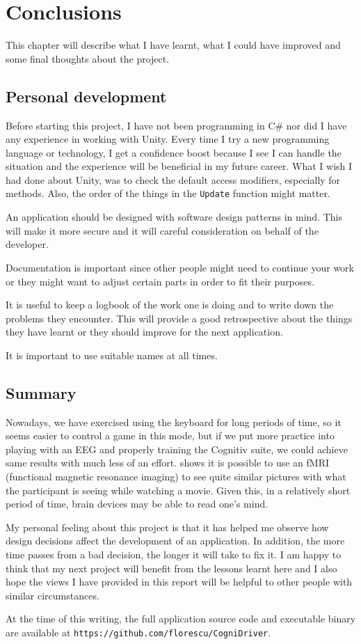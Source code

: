\chapter{Conclusions}
\label{cha:conclusions}
This chapter will describe what I have learnt, what I could have improved and some final thoughts about the project.

\section{Personal development}
Before starting this project, I have not been programming in C\# nor did I have any experience in working with Unity. Every time I try a new programming language or technology, I get a confidence boost because I see I can handle the situation and the experience will be beneficial in my future career. What I wish I had done about Unity, was to check the default access modifiers, especially for methods. Also, the order of the things in the \texttt{Update} function might matter. 

An application should be designed with software design patterns in mind. This will make it more secure and it will careful consideration on behalf of the developer. 

Documentation is important since other people might need to continue your work or they might want to adjust certain parts in order to fit their purposes.

It is useful to keep a logbook of the work one is doing and to write down the problems they encounter. This will provide a good retrospective about the things they have learnt or they should improve for the next application.

It is important to use suitable names at all times.

\section{Summary}

Nowadays, we have exercised using the keyboard for long periods of time, so it seems easier to control a game in this mode, but if we put more practice into playing with an EEG and properly training the Cognitiv suite, we could achieve same results with much less of an effort. \cite{moviebrain} shows it is possible to use an fMRI (functional magnetic resonance imaging) to see quite similar pictures with what the participant is seeing while watching a movie. Given this, in a relatively short period of time, brain devices may be able to read one's mind.

My personal feeling about this project is that it has helped me observe how design decisions affect the development of an application. In addition, the more time passes from a bad decision, the longer it will take to fix it. I am happy to think that my next project will benefit from the lessons learnt here and I also hope the views I have provided in this report will be helpful to other people with similar circumstances.

At the time of this writing, the full application source code and executable binary are available at \texttt{https://github.com/florescu/CogniDriver}.

\nocite{jmurray}